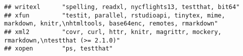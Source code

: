 \documentclass[]{book}
\begin{document}
\begin{verbatim}
## writexl      "spelling, readxl, nycflights13, testthat, bit64"                                                                                                                                                                                                                                                                                                                                                                                                                                                                                                                                                                                                                                                         
## xfun         "testit, parallel, rstudioapi, tinytex, mime, markdown, knitr,\nhtmltools, base64enc, remotes, rmarkdown"                                                                                                                                                                                                                                                                                                                                                                                                                                                                                                                                                                                                 
## xml2         "covr, curl, httr, knitr, magrittr, mockery, rmarkdown,\ntestthat (>= 2.1.0)"                                                                                                                                                                                                                                                                                                                                                                                                                                                                                                                                                                                                                             
## xopen        "ps, testthat"                                                                                                                                                                                                                                                                                                                                                                                                                                                                                                                                                                                                                                                                                            

\end{verbatim}
\end{document}
